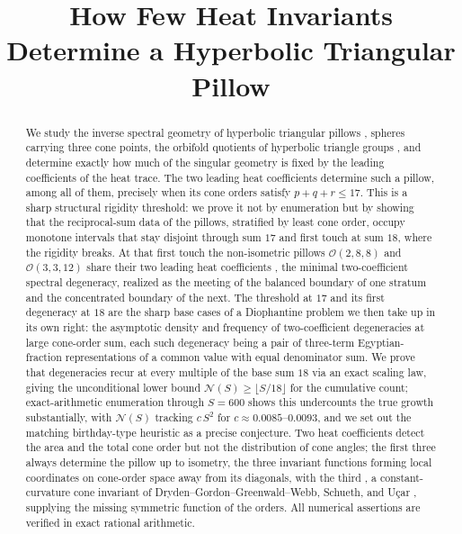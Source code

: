 \documentclass[12pt, letterpaper]{article}
\title{\vspace{-2cm}\Large\textbf{How Few Heat Invariants Determine a Hyperbolic Triangular Pillow}}
\date{}
\theoremstyle{definition}
\theoremstyle{plain}
\begin{document}
\maketitle
\thispagestyle{empty}

\begin{abstract}
    \noindent We study the inverse spectral geometry of hyperbolic triangular pillows ,  spheres carrying three cone points, the orbifold quotients of hyperbolic triangle groups ,  and determine exactly how much of the singular geometry is fixed by the leading coefficients of the heat trace. The two leading heat coefficients determine such a pillow, among all of them, precisely when its cone orders satisfy $p+q+r\le 17$. This is a sharp structural rigidity threshold: we prove it not by enumeration but by showing that the reciprocal-sum data of the pillows, stratified by least cone order, occupy monotone intervals that stay disjoint through sum $17$ and first touch at sum $18$, where the rigidity breaks. At that first touch the non-isometric pillows $\mathcal{O}(2,8,8)$ and $\mathcal{O}(3,3,12)$ share their two leading heat coefficients ,  the minimal two-coefficient spectral degeneracy, realized as the meeting of the balanced boundary of one stratum and the concentrated boundary of the next. The threshold at $17$ and its first degeneracy at $18$ are the sharp base cases of a Diophantine problem we then take up in its own right: the asymptotic density and frequency of two-coefficient degeneracies at large cone-order sum, each such degeneracy being a pair of three-term Egyptian-fraction representations of a common value with equal denominator sum. We prove that degeneracies recur at every multiple of the base sum $18$ via an exact scaling law, giving the unconditional lower bound $\mathcal N(S)\ge\lfloor S/18\rfloor$ for the cumulative count; exact-arithmetic enumeration through $S=600$ shows this undercounts the true growth substantially, with $\mathcal N(S)$ tracking $c\,S^2$ for $c\approx0.0085$--$0.0093$, and we set out the matching birthday-type heuristic as a precise conjecture. Two heat coefficients detect the area and the total cone order but not the distribution of cone angles; the first three always determine the pillow up to isometry, the three invariant functions forming local coordinates on cone-order space away from its diagonals, with the third ,  a constant-curvature cone invariant of Dryden--Gordon--Greenwald--Webb, Schueth, and U\c{c}ar ,  supplying the missing symmetric function of the orders. All numerical assertions are verified in exact rational arithmetic.
\end{abstract}
\end{document}
